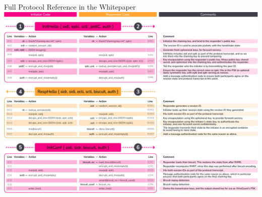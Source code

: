 \begin{frame}{Full Protocol Reference in the Whitepaper}
  \hypertarget{the-rosenpass-protocol-3}{}
  \centering
 \includegraphics[height=.90\textheight]{graphics/rosenpass-wp-message-handling-code-rgb.pdf}
\end{frame}
